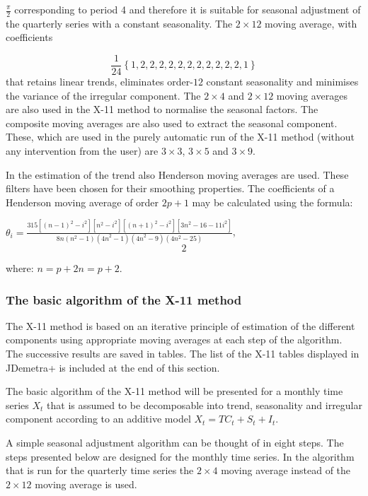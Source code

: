 \documentclass[
  letterpaper,
  DIV=11,
  numbers=noendperiod]{scrreprt}
\begin{document}
\(\frac{\pi}{2}\) corresponding to period 4 and therefore it is suitable
for seasonal adjustment of the quarterly series with a constant
seasonality. The \(2 \times 12\) moving average, with coefficients

\[\frac{1}{24}\left\{1, 2, 2, 2, 2, 2, 2, 2, 2, 2, 2, 2, 1\right\} \]that
retains linear trends, eliminates order-\(12\) constant seasonality and
minimises the variance of the irregular component. The \(2 \times 4\)
and \(2 \times 12\) moving averages are also used in the X-11 method to
normalise the seasonal factors. The composite moving averages are also
used to extract the seasonal component. These, which are used in the
purely automatic run of the X-11 method (without any intervention from
the user) are \(3 \times 3\), \(3 \times 5\) and \(3 \times 9\).

In the estimation of the trend also Henderson moving averages are used.
These filters have been chosen for their smoothing properties. The
coefficients of a Henderson moving average of order \(2p + 1\) may be
calculated using the formula:

\(\theta_{i} = \frac{315\left\lbrack \left( n - 1 \right)^{2} - i^{2} \right\rbrack\left\lbrack n^{2} - i^{2} \right\rbrack\left\lbrack \left( n + 1 \right)^{2} - i^{2} \right\rbrack\left\lbrack {3n}^{2} - 16 - 11i^{2} \right\rbrack}{8n\left( n^{2} - 1 \right)\left( {4n}^{2} - 1 \right)\left( {4n}^{2} - 9 \right)\left( 4n^{2} - 25 \right)}\),
\[2\]

where: \(n = p + 2\)\(n = p + 2\).

\hypertarget{the-basic-algorithm-of-the-x-11-method}{%
\subsubsection{The basic algorithm of the X-11
method}\label{the-basic-algorithm-of-the-x-11-method}}

The X-11 method is based on an iterative principle of estimation of the
different components using appropriate moving averages at each step of
the algorithm. The successive results are saved in tables. The list of
the X-11 tables displayed in JDemetra+ is included at the end of this
section.

The basic algorithm of the X-11 method will be presented for a monthly
time series \(X_{t}\) that is assumed to be decomposable into trend,
seasonality and irregular component according to an additive model
\(X_{t} = TC_{t} + S_{t} + I_{t}\).

A simple seasonal adjustment algorithm can be thought of in eight steps.
The steps presented below are designed for the monthly time series. In
the algorithm that is run for the quarterly time series the
\(2 \times 4\) moving average instead of the \(2 \times 12\) moving
average is used.
\end{document}
